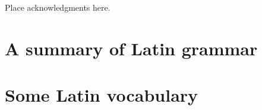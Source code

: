 \documentclass{ifacconf}
\begin{document}
\begin{ack}
Place acknowledgments here.
\end{ack}

                                                   







\appendix
\section{A summary of Latin grammar}    %
\section{Some Latin vocabulary}              %
\end{document}
